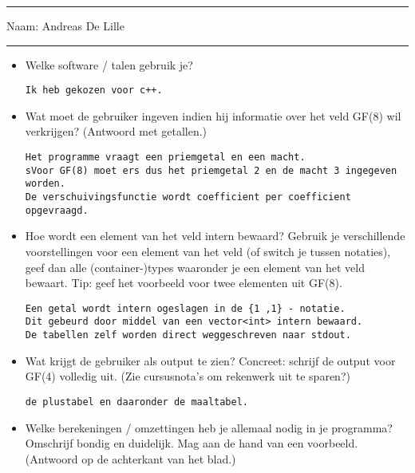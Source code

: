 \documentclass[11pt]{article}
\begin{document}
\begin{center}
\vspace{-4mm}{Discr Wisk \hfill\bf Eindige velden: vorderingen programmeeroefening \hfill 20 febr 2014}
\end{center}
\hrule
Naam: Andreas De Lille\\
\hrule

\begin{itemize}
\item Welke software / talen gebruik je?
\begin{Verbatim}[frame=single]
Ik heb gekozen voor c++.
\end{Verbatim}

\item Wat moet de gebruiker ingeven indien hij informatie over het veld GF(8) wil verkrijgen? (Antwoord met getallen.)
\begin{Verbatim}[frame=single]
Het programme vraagt een priemgetal en een macht. 
sVoor GF(8) moet ers dus het priemgetal 2 en de macht 3 ingegeven worden.
De verschuivingsfunctie wordt coefficient per coefficient opgevraagd.
\end{Verbatim}

\item Hoe wordt een element van het veld intern bewaard? Gebruik je verschillende voorstellingen voor een element van het veld (of switch je tussen notaties), 
geef dan alle (container-)types waaronder je een element van het veld bewaart. Tip: geef het voorbeeld voor twee elementen uit GF(8). 
\begin{Verbatim}[frame=single]
Een getal wordt intern ogeslagen in de {1 ,1} - notatie.
Dit gebeurd door middel van een vector<int> intern bewaard.
De tabellen zelf worden direct weggeschreven naar stdout.
\end{Verbatim}

\item Wat krijgt de gebruiker als output te zien? Concreet: schrijf de output voor GF(4) volledig uit. (Zie cursusnota's om rekenwerk uit te sparen?)
\begin{Verbatim}[frame=single]
de plustabel en daaronder de maaltabel.

\end{Verbatim}

\item Welke berekeningen / omzettingen heb je allemaal nodig in je programma? Omschrijf bondig en duidelijk. Mag aan de hand van een voorbeeld.
(Antwoord op de achterkant van het blad.)


\end{itemize}
\end{document}
